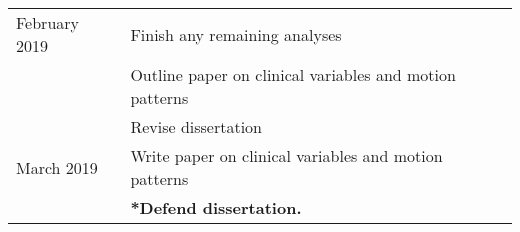 \begin{table}[t]
\begin{tabular}{p{}|p{}}
February 2019  & Finish any remaining analyses                                                                                        \\
              & Outline paper on clinical variables and motion patterns                                                              \\
             & Revise dissertation                                                                                                  \\ \hline
March 2019     & Write paper on clinical variables and motion patterns                                                                \\
              & \textbf{*Defend dissertation.}                                                                                       \\
\end{tabular}
\end{table}




